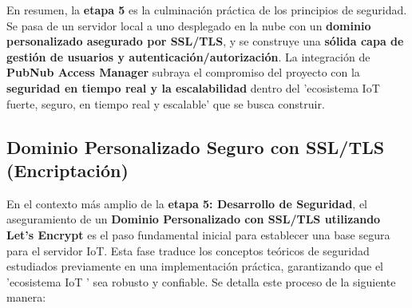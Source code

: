 \documentclass{report}
\begin{document}
En resumen, la \textbf{etapa 5} es la culminación práctica de los principios de seguridad. Se pasa de un servidor local a uno desplegado en la nube 
con un \textbf{dominio personalizado asegurado por SSL/TLS}, y se construye una \textbf{sólida capa de gestión de usuarios y autenticación/autorización}. 
La integración de \textbf{PubNub Access Manager} subraya el compromiso del proyecto con la \textbf{seguridad en tiempo real y la escalabilidad} dentro del 
'ecosistema IoT fuerte, seguro, en tiempo real y escalable' que se busca construir.

\subsection{Dominio Personalizado Seguro con SSL/TLS (Encriptación)}
En el contexto más amplio de la \textbf{etapa 5: Desarrollo de Seguridad}, el aseguramiento de un \textbf{Dominio Personalizado con SSL/TLS utilizando 
Let's Encrypt} es el paso fundamental inicial para establecer una base segura para el servidor IoT. Esta fase traduce los conceptos teóricos de seguridad 
estudiados previamente en una implementación práctica, garantizando que el  'ecosistema IoT ' sea robusto y confiable. Se detalla este proceso 
de la siguiente manera:
\end{document}
